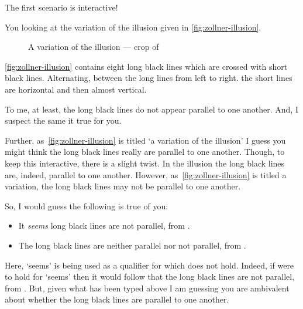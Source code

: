 \begin{note}
  The first scenario is interactive!

  \begin{scenario}
    You looking at the variation of the \citeauthor{Zollner:1860vx} illusion given in \autoref{fig:zollner-illusion}.
    \begin{figure}[!h]
      \centering
      \def\svgwidth{\columnwidth}
      
      \caption{A variation of the \citeauthor{Zollner:1860vx} illusion --- crop of ~\textcite{Fibonacci:2007vj}}
      \label{fig:zollner-illusion}
    \end{figure}
  \end{scenario}

  \autoref{fig:zollner-illusion} contains eight long black lines which are crossed with short black lines.
  Alternating, between the long lines from left to right. the short lines are horizontal and then almost vertical.

  To me, at least, the long black lines do not appear parallel to one another.
  And, I suspect the same it true for you.

  Further, as~\autoref{fig:zollner-illusion} is titled `a variation of the \citeauthor{Zollner:1860vx} illusion' I guess you might think the long black lines really are parallel to one another.
  Though, to keep this interactive, there is a slight twist.
  In the \citeauthor{Zollner:1860vx} illusion the long black lines are, indeed, parallel to one another.
  However, as~\autoref{fig:zollner-illusion} is titled a variation, the long black lines may not be parallel to one another.

  So, I would guess the following is true of you:

  \begin{itemize}[noitemsep]
  \item
    It \emph{seems} long black lines are not parallel, from .
  \item
    The long black lines are neither parallel nor not parallel, from .
  \end{itemize}

  Here, `seems' is being used as a qualifier for which \ptivity{} does not hold.
  Indeed, if \ptivity{} were to hold for `seems' then it would follow that the long black lines are not parallel, from .
  But, given what has been typed above I am guessing you are ambivalent about whether the long black lines are parallel to one another.


\end{note}
